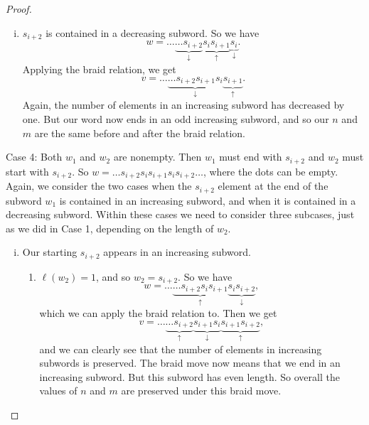 \documentclass[10pt,a4paper]{amsart}
\begin{document}
\begin{proof}
\begin{enumerate}[(i)]
    Applying the braid relation we have 
    \[v=\hdots\underbrace{\hdots s_{i+2}}_\uparrow \underbrace{s_{i+1}s_i}_\downarrow \underbrace{s_{i+1}}_\uparrow.\]
    Now we note that everything up to, and including, our $s_{i+2}$ has not been changed, and so whether it is in an increasing or decreasing subword has not changed. Then, overall, the number of elements in an increasing subword has decreased by one, so we now have $u-1$ elements in increasing subwords. But we are now ending in an odd length increasing subword, so we still have $x_v=u$ and $y_v=\ell(w)-u$. Then our $n$ and $m$ are unchanged. 

    \item $s_{i+2}$ is contained in a decreasing subword. So we have 
    \[w=\hdots\underbrace{\hdots s_{i+2}}_\downarrow \underbrace{s_is_{i+1}}_\uparrow \underbrace{s_i}_\downarrow.\] 
    Applying the braid relation, we get
    \[v=\hdots\underbrace{\hdots s_{i+2}s_{i+1}s_i}_\downarrow \underbrace{s_{i+1}}_\uparrow.\]
    Again, the number of elements in an increasing subword has decreased by one. But our word now ends in an odd increasing subword, and so our $n$ and $m$ are the same before and after the braid relation.
    \end{enumerate}


    Case 4: Both $w_1$ and $w_2$ are nonempty. Then $w_1$ must end with $s_{i+2}$ and $w_2$ must start with $s_{i+2}$. So $w=\hdots s_{i+2}s_is_{i+1}s_is_{i+2}\hdots$, where the dots can be empty. Again, we consider the two cases when the $s_{i+2}$ element at the end of the subword $w_1$ is contained in an increasing subword, and when it is contained in a decreasing subword. Within these cases we need to consider three subcases, just as we did in Case 1, depending on the length of $w_2$. 

    
    \begin{enumerate}[(i)]
        \item Our starting $s_{i+2}$ appears in an increasing subword.
        \begin{enumerate}
        \item $\ell(w_2)=1$, and so $w_2=s_{i+2}$. So we have
        \[w=\hdots\underbrace{\hdots s_{i+2}s_is_{i+1}}_\uparrow\underbrace{s_is_{i+2}}_\downarrow,\]
        which we can apply the braid relation to. Then we get
        \[v=\hdots\underbrace{\hdots s_{i+2}}_\uparrow\underbrace{s_{i+1}s_i}_\downarrow\underbrace{s_{i+1}s_{i+2}}_\uparrow,\]
        and we can clearly see that the number of elements in increasing subwords is preserved. The braid move now means that we end in an increasing subword. But this subword has even length. So overall the values of $n$ and $m$ are preserved under this braid move.


\end{enumerate}
\end{enumerate}
\end{proof}
\end{document}
